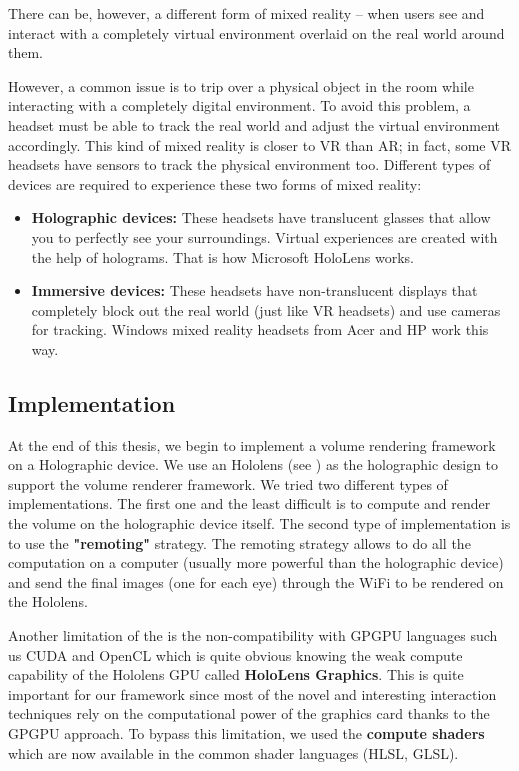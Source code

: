 There can be, however, a different form of mixed reality – when users see and interact with a completely virtual environment overlaid on the real world around them.

However, a common issue is to trip over a physical object in the room while interacting with a completely digital environment.
To avoid this problem, a headset must be able to track the real world and adjust the virtual environment accordingly. This kind of mixed reality is closer to VR than AR; in fact, some VR headsets have sensors to track the physical environment too. Different types of devices are required to experience these two forms of mixed reality:

\begin{itemize}
 \item \textbf{ Holographic devices: } These headsets have translucent glasses that allow you to perfectly see your surroundings. Virtual experiences are created with the help of holograms. That is how Microsoft HoloLens works.
 
 \item \textbf{ Immersive devices:} These headsets have non-translucent displays that completely block out the real world (just like VR headsets) and use cameras for tracking. Windows mixed reality headsets from Acer and HP work this way.

\end{itemize}

\subsection{Implementation}

At the end of this thesis, we begin to implement a volume rendering framework on a Holographic device. We use an Hololens (see \cite{hololens}) as the holographic design to support the volume renderer framework. We tried two different types of implementations. The first one and the least difficult is to compute and render the volume on the holographic device itself. The second type of implementation is to use the \textbf{ "remoting" } strategy. The remoting strategy allows to do all the computation on a computer (usually more powerful than the holographic device) and send the final images (one for each eye) through the WiFi to be rendered on the Hololens.


Another limitation of the \cite{hololens} is the non-compatibility with GPGPU languages such us CUDA and OpenCL which is quite obvious knowing the weak compute capability of the Hololens GPU called \textbf{HoloLens Graphics}. This is quite important for our framework since most of the novel and interesting interaction techniques rely on the computational power of the graphics card thanks to the GPGPU approach. \newline
To bypass this limitation, we used the \textbf{ compute shaders} which are now available in the common shader languages (HLSL, GLSL).


